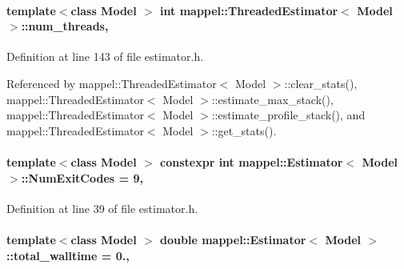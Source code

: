 \paragraph[{\texorpdfstring{num\+\_\+threads}{num_threads}}]{\setlength{\rightskip}{0pt plus 5cm}template$<$class Model $>$ int {\bf mappel\+::\+Threaded\+Estimator}$<$ Model $>$\+::num\+\_\+threads\hspace{0.3cm}{\ttfamily [protected]}, {\ttfamily [inherited]}}\hypertarget{classmappel_1_1ThreadedEstimator_a6afa05d7d971f3317ce1602de853123b}{}\label{classmappel_1_1ThreadedEstimator_a6afa05d7d971f3317ce1602de853123b}


Definition at line 143 of file estimator.\+h.



Referenced by mappel\+::\+Threaded\+Estimator$<$ Model $>$\+::clear\+\_\+stats(), mappel\+::\+Threaded\+Estimator$<$ Model $>$\+::estimate\+\_\+max\+\_\+stack(), mappel\+::\+Threaded\+Estimator$<$ Model $>$\+::estimate\+\_\+profile\+\_\+stack(), and mappel\+::\+Threaded\+Estimator$<$ Model $>$\+::get\+\_\+stats().

\paragraph[{\texorpdfstring{Num\+Exit\+Codes}{NumExitCodes}}]{\setlength{\rightskip}{0pt plus 5cm}template$<$class Model $>$ constexpr int {\bf mappel\+::\+Estimator}$<$ Model $>$\+::Num\+Exit\+Codes = 9\hspace{0.3cm}{\ttfamily [static]}, {\ttfamily [inherited]}}\hypertarget{classmappel_1_1Estimator_afcec036c4d78c12d427e0a733a00a48e}{}\label{classmappel_1_1Estimator_afcec036c4d78c12d427e0a733a00a48e}


Definition at line 39 of file estimator.\+h.

\paragraph[{\texorpdfstring{total\+\_\+walltime}{total_walltime}}]{\setlength{\rightskip}{0pt plus 5cm}template$<$class Model $>$ double {\bf mappel\+::\+Estimator}$<$ Model $>$\+::total\+\_\+walltime = 0.\hspace{0.3cm}{\ttfamily [protected]}, {\ttfamily [inherited]}}\hypertarget{classmappel_1_1Estimator_a5a408458a111c5222193871fa6bb6644}{}\label{classmappel_1_1Estimator_a5a408458a111c5222193871fa6bb6644}



